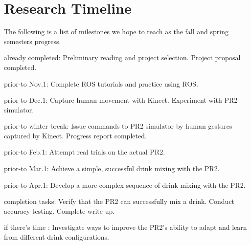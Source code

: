 \documentclass{sig-alternate}
\begin{document}
\section{Research Timeline}
\label{sec:research_timeline}
The following is a list of milestones we hope to reach as the fall and spring semesters progress. 

\begin{itemize*}
	\item {\sc already completed}: Preliminary reading and project selection. Project proposal completed.\vspace{3pt}
	\item {\sc prior-to Nov.1}: Complete ROS tutorials and practice using ROS.\vspace{3pt}
	\item {\sc prior-to Dec.1}: Capture human movement with Kinect. Experiment with PR2 simulator.\vspace{3pt}
	\item {\sc prior-to winter break}: Issue commands to PR2 simulator by human gestures captured by Kinect. Progress report completed.\vspace{3pt}
	\item {\sc prior-to Feb.1}: Attempt real trials on the actual PR2.\vspace{3pt}
	\item {\sc prior-to Mar.1}: Achieve a simple, successful drink mixing with the PR2.\vspace{3pt}
	\item {\sc prior-to Apr.1}: Develop a more complex sequence of drink mixing with the PR2.\vspace{3pt}
	\item {\sc completion tasks}: Verify that the PR2 can successfully mix a drink. Conduct accuracy testing. Complete write-up.\vspace{3pt}
	\item {\sc if there's time} : Investigate ways to improve the PR2's ability to adapt and learn from different drink configurations.
\end{itemize*}


\vspace{150pt}
\end{document}
